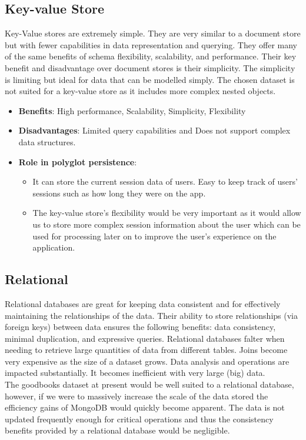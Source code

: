 \documentclass[11pt]{article}
\begin{document}
\subsection{Key-value Store}
\label{sec:orgd04f335}
Key-Value stores are extremely simple. They are very similar to a document store but with fewer capabilities in data representation and querying. They offer many of the same benefits of schema flexibility, scalability, and performance. Their key benefit and disadvantage over document stores is their simplicity. The simplicity is limiting but ideal for data that can be modelled simply. The chosen dataset is not suited for a key-value store as it includes more complex nested objects.
\begin{itemize}
\item \textbf{Benefits}: High performance, Scalability, Simplicity, Flexibility
\item \textbf{Disadvantages}: Limited query capabilities and Does not support complex data structures.
\item \textbf{Role in polyglot persistence}:
\begin{itemize}
\item It can store the current session data of users. Easy to keep track of users' sessions such as how long they were on the app.
\item The key-value store's flexibility would be very important as it would allow us to store more complex session information about the user which can be used for processing later on to improve the user's experience on the application.
\end{itemize}
\end{itemize}
\subsection{Relational}
\label{sec:org651086e}
Relational databases are great for keeping data consistent and for effectively maintaining the relationships of the data. Their ability to store relationships (via foreign keys) between data ensures the following benefits: data consistency, minimal duplication, and expressive queries. Relational databases falter when needing to retrieve large quantities of data from different tables. Joins become very expensive as the size of a dataset grows. Data analysis and operations are impacted substantially. It becomes inefficient with very large (big) data.\\
\linebreak
The goodbooks dataset at present would be well suited to a relational database, however, if we were to massively increase the scale of the data stored the efficiency gains of MongoDB would quickly become apparent. The data is not updated frequently enough for critical operations and thus the consistency benefits provided by a relational database would be negligible.
\end{document}
